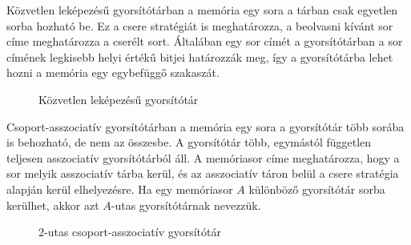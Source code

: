 \documentclass[12pt]{report}
\begin{document}
Közvetlen leképezésű gyorsítótárban\cite{computer-architecture} a memória
egy sora a tárban csak egyetlen sorba hozható be.
Ez a csere stratégiát is meghatározza,
a beolvasni kívánt sor címe meghatározza a cserélt sort.
Általában egy sor címét a gyorsítótárban a sor címének
legkisebb helyi értékű bitjei határozzák meg,
így a gyorsítótárba lehet hozni a memória egy egybefüggő szakaszát.

\begin{figure}[ht]
\centering
{}
\caption{Közvetlen leképezésű gyorsítótár}
\label{fig:direct-mapped-cache}
\end{figure}

Csoport-asszociatív gyorsítótárban\cite{computer-architecture} a memória egy sora
a gyorsítótár több sorába is behozható, de nem az összesbe.
A gyorsítótár több, egymástól független teljesen asszociatív gyorsítótárból
áll. A memóriasor címe meghatározza, hogy a sor melyik asszociatív tárba
kerül, és az asszociatív táron belül a csere stratégia alapján
kerül elhelyezésre.
Ha egy memóriasor $A$ különböző gyorsítótár sorba kerülhet,
akkor azt $A$-utas gyorsítótárnak nevezzük.

\begin{figure}[ht]
\centering
{}
\caption{2-utas csoport-asszociatív gyorsítótár}
\label{fig:set-associative-cache}
\end{figure}
\end{document}
